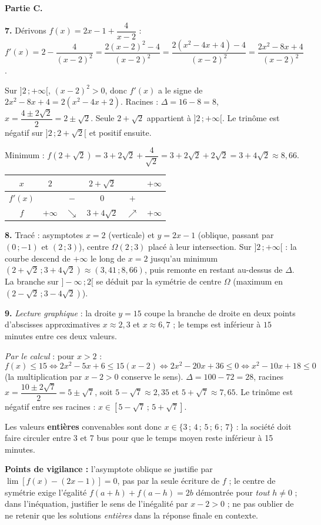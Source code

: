 \documentclass[11pt]{article}
\begin{document}
\begin{corrige}
\textbf{Partie C.}

\textbf{7.} Dérivons $f(x)=2x-1+\dfrac{4}{x-2}$ : $f'(x)=2-\dfrac{4}{(x-2)^2}=\dfrac{2(x-2)^2-4}{(x-2)^2}=\dfrac{2(x^2-4x+4)-4}{(x-2)^2}=\dfrac{2x^2-8x+4}{(x-2)^2}$.

Sur $]2\,;+\infty[$, $(x-2)^2>0$, donc $f'(x)$ a le signe de $2x^2-8x+4=2(x^2-4x+2)$. Racines : $\Delta=16-8=8$, $x=\dfrac{4\pm 2\sqrt{2}}{2}=2\pm\sqrt{2}$. Seule $2+\sqrt{2}$ appartient à $]2\,;+\infty[$. Le trinôme est négatif sur $]2\,;2+\sqrt{2}[$ et positif ensuite.

Minimum : $f(2+\sqrt{2})=3+2\sqrt{2}+\dfrac{4}{\sqrt{2}}=3+2\sqrt{2}+2\sqrt{2}=\boxed{3+4\sqrt{2}}\approx 8{,}66$.

\begin{center}
\begin{tabular}{|c|ccccc|}\hline
$x$ & $2$ & & $2+\sqrt{2}$ & & $+\infty$ \\ \hline
$f'(x)$ & & $-$ & $0$ & $+$ & \\ \hline
$f$ & $+\infty$ & $\searrow$ & $3+4\sqrt{2}$ & $\nearrow$ & $+\infty$ \\ \hline
\end{tabular}
\end{center}

\textbf{8.} Tracé : asymptotes $x=2$ (verticale) et $y=2x-1$ (oblique, passant par $(0\,;-1)$ et $(2\,;3)$), centre $\Omega(2\,;3)$ placé à leur intersection. Sur $]2\,;+\infty[$ : la courbe descend de $+\infty$ le long de $x=2$ jusqu'au minimum $(2+\sqrt{2}\,;3+4\sqrt{2})\approx(3{,}41\,;8{,}66)$, puis remonte en restant au-dessus de $\Delta$. La branche sur $]-\infty\,;2[$ se déduit par la symétrie de centre $\Omega$ (maximum en $(2-\sqrt{2}\,;3-4\sqrt{2})$).

\textbf{9.} \emph{Lecture graphique} : la droite $y=15$ coupe la branche de droite en deux points d'abscisses approximatives $x\approx 2{,}3$ et $x\approx 6{,}7$ ; le temps est inférieur à $15$ minutes entre ces deux valeurs.

\emph{Par le calcul} : pour $x>2$ :
\[ f(x)\leq 15\iff 2x^2-5x+6\leq 15(x-2)\iff 2x^2-20x+36\leq 0\iff x^2-10x+18\leq 0 \]
(la multiplication par $x-2>0$ conserve le sens). $\Delta=100-72=28$, racines $x=\dfrac{10\pm 2\sqrt{7}}{2}=5\pm\sqrt{7}$, soit $5-\sqrt{7}\approx 2{,}35$ et $5+\sqrt{7}\approx 7{,}65$. Le trinôme est négatif entre ses racines : $x\in[5-\sqrt{7}\,;\,5+\sqrt{7}]$.

Les valeurs \textbf{entières} convenables sont donc $x\in\{3\,;\,4\,;\,5\,;\,6\,;\,7\}$ : la société doit faire circuler entre 3 et 7 bus pour que le temps moyen reste inférieur à 15 minutes.

\textbf{Points de vigilance :} l'asymptote oblique se justifie par $\lim[f(x)-(2x-1)]=0$, pas par la seule écriture de $f$ ; le centre de symétrie exige l'égalité $f(a+h)+f(a-h)=2b$ démontrée pour \emph{tout} $h\neq 0$ ; dans l'inéquation, justifier le sens de l'inégalité par $x-2>0$ ; ne pas oublier de ne retenir que les solutions \emph{entières} dans la réponse finale en contexte.
\end{corrige}
\end{document}
